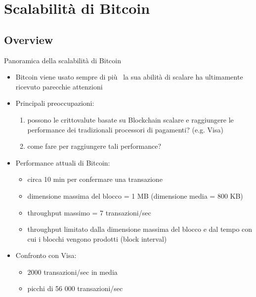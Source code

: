 \documentclass{beamer}
\begin{document}
  
  
  
  
  \section{Scalabilità di Bitcoin}
  \subsection{Overview}
  \begin{frame}{Panoramica della scalabilità di Bitcoin}
      \begin{itemize}
          \item Bitcoin viene usato sempre di più \MVRightarrow\, la sua abilità di scalare ha ultimamente ricevuto parecchie attenzioni
          \item Principali preoccupazioni:
          \begin{enumerate}
              \item possono le crittovalute basate su Blockchain scalare e raggiungere le performance dei tradizionali processori di pagamenti? (e.g. Visa)
              \item come fare per raggiungere tali performance? 
          \end{enumerate}
          \pause
          \item Performance attuali di Bitcoin: 
          \begin{itemize}
              \item circa 10 min per confermare una transazione 
              \item dimensione massima del blocco = 1 MB (dimensione media = 800 KB) \cite{current-block-size}
              \item throughput massimo = 7 transazioni/sec \cite{wikipedia_scalability_2018}
              \item throughput limitato dalla dimensione massima del blocco e dal tempo con cui i blocchi vengono prodotti (block interval)
          \end{itemize} \pause
          \item Confronto con Visa:  \cite{wikipedia_scalability_2018}
          \begin{itemize}
              \item 2000 transazioni/sec in media 
              \item picchi di 56 000 transazioni/sec
          \end{itemize}
      \end{itemize}
  \end{frame}
  
\end{document}
